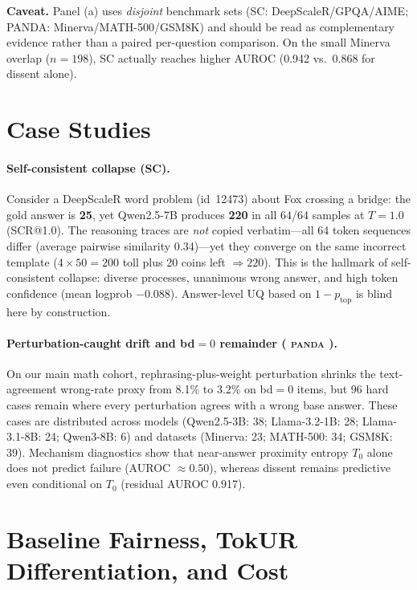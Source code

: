 \documentclass{article} %
\DeclareRobustCommand{\method}{%
  \texorpdfstring{%
    \ifmmode\text{\normalfont\textsc{panda}}\else\textsc{panda}\xspace\fi
  }{PANDA}%
}
\begin{document}
\noindent\textbf{Caveat.} Panel (a) uses \emph{disjoint} benchmark sets (SC: DeepScaleR/GPQA/AIME; PANDA: Minerva/MATH-500/GSM8K) and should be read as complementary evidence rather than a paired per-question comparison.
On the small Minerva overlap ($n{=}198$), SC actually reaches higher AUROC (0.942 vs.\ 0.868 for dissent alone).


\section{Case Studies}
\label{app:cases}

\paragraph{Self-consistent collapse (SC).}
Consider a DeepScaleR word problem (id~12473) about Fox crossing a bridge: the gold answer is \textbf{25}, yet Qwen2.5-7B produces \textbf{220} in all 64/64 samples at $T{=}1.0$ (SCR@1.0).
The reasoning traces are \emph{not} copied verbatim---all 64 token sequences differ (average pairwise similarity 0.34)---yet they converge on the same incorrect template ($4\times50=200$ toll plus 20 coins left $\Rightarrow\boxed{220}$).
This is the hallmark of self-consistent collapse: diverse processes, unanimous wrong answer, and high token confidence (mean logprob $-0.088$).
Answer-level UQ based on $1-p_{\mathrm{top}}$ is blind here by construction.

\paragraph{Perturbation-caught drift and bd$=0$ remainder (\method{}).}
On our main math cohort, rephrasing-plus-weight perturbation shrinks the text-agreement wrong-rate proxy from 8.1\% to 3.2\% on bd$=0$ items, but 96 hard cases remain where every perturbation agrees with a wrong base answer.
These cases are distributed across models (Qwen2.5-3B: 38; Llama-3.2-1B: 28; Llama-3.1-8B: 24; Qwen3-8B: 6) and datasets (Minerva: 23; MATH-500: 34; GSM8K: 39).
Mechanism diagnostics show that near-answer proximity entropy $T_0$ alone does not predict failure (AUROC $\approx 0.50$), whereas dissent remains predictive even conditional on $T_0$ (residual AUROC 0.917).


\section{Baseline Fairness, TokUR Differentiation, and Cost}
\label{app:fairness}
\end{document}
